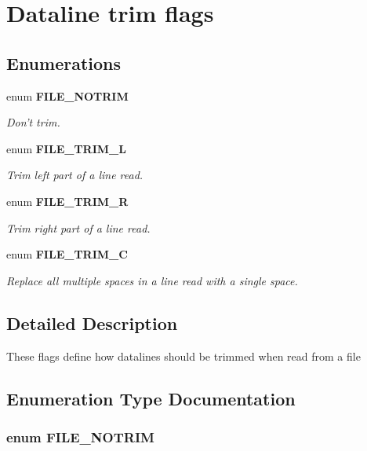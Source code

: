 \section{Dataline trim flags}
\label{group__FILR__TrimFlags}
\subsection*{Enumerations}
\begin{DoxyCompactItemize}
\item 
enum {\bf FILE\_\-NOTRIM} 
\begin{DoxyCompactList}\small\item\em Don't trim. \end{DoxyCompactList}\item 
enum {\bf FILE\_\-TRIM\_\-L} 
\begin{DoxyCompactList}\small\item\em Trim left part of a line read. \end{DoxyCompactList}\item 
enum {\bf FILE\_\-TRIM\_\-R} 
\begin{DoxyCompactList}\small\item\em Trim right part of a line read. \end{DoxyCompactList}\item 
enum {\bf FILE\_\-TRIM\_\-C} 
\begin{DoxyCompactList}\small\item\em Replace all multiple spaces in a line read with a single space. \end{DoxyCompactList}\end{DoxyCompactItemize}


\subsection{Detailed Description}
These flags define how datalines should be trimmed when read from a file 

\subsection{Enumeration Type Documentation}
\subsubsection[{FILE\_\-NOTRIM}]{\setlength{\rightskip}{0pt plus 5cm}enum {\bf FILE\_\-NOTRIM}}\label{group__FILR__TrimFlags_ga3720f2e15eb9e16e29d8ecbb96763662}


